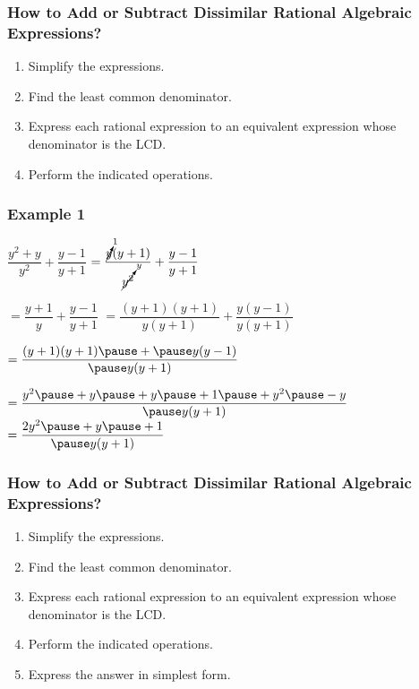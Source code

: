 \documentclass[14pt]{beamer}
\begin{document}
    \begin{frame}
    	\frametitle{How to Add or Subtract Dissimilar Rational Algebraic Expressions?}
    	\begin{enumerate}
    		\item Simplify the expressions.
    		\item Find the least common denominator. 
    		\item Express each rational expression to an equivalent expression whose denominator is the LCD.
    		\item Perform the indicated operations.
    	\end{enumerate}
    \end{frame}

    \begin{frame}
    	\frametitle{Example 1}
    	$\dfrac{y^2+y}{y^2} + \dfrac{y-1}{y+1}$
    	$ = \dfrac{\cancelto{1}{y} (y + 1) }{\cancelto{y}{y^2}} + \dfrac{y-1}{y+1}$
    	
    	\vspace{1em}\hspace{1em} $ = \dfrac{y+1}{y} + \dfrac{y-1}{y+1} $
    	$ = \dfrac{(y+1) (y+1)}{y(y+1)} + \dfrac{y (y - 1)}{y (y + 1)}$
    	
    	\pause \vspace{1em}\hspace{1em} $ = \dfrac{ (y+1)(y+1) \pause + \pause y(y - 1) }{\pause y(y+1)} $
    	
    	\pause \vspace{1em}\hspace{1em} $ = \dfrac{y^2 \pause + y \pause + y \pause + 1 \pause + y^2 \pause -y}{\pause y(y + 1)} $
    	\pause $ = \dfrac{2y^2 \pause + y \pause + 1}{\pause y(y + 1)} $
    \end{frame}

    \begin{frame}
    	\frametitle{How to Add or Subtract Dissimilar Rational Algebraic Expressions?}
    	\begin{enumerate}
    		\item Simplify the expressions.
    		\item Find the least common denominator. 
    		\item Express each rational expression to an equivalent expression whose denominator is the LCD.
    		\item Perform the indicated operations.
    		\item Express the answer in simplest form.
    	\end{enumerate}
    \end{frame}
\end{document}
